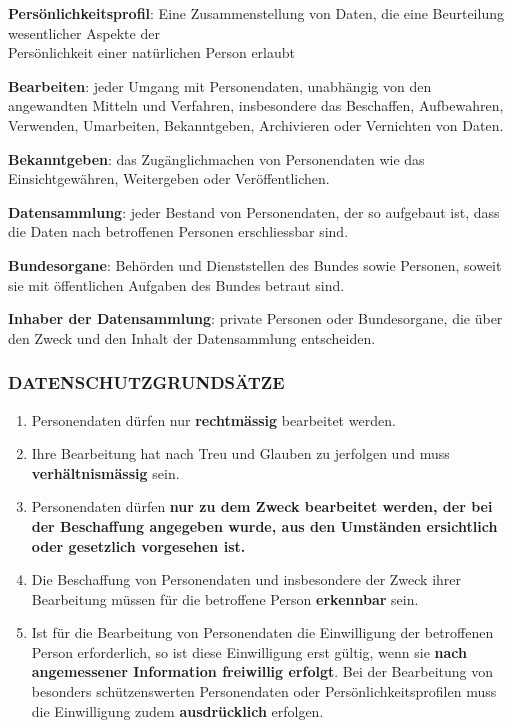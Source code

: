 \textbf{Persönlichkeitsprofil}: Eine Zusammenstellung von Daten, die
eine Beurteilung wesentlicher Aspekte der\\
Persönlichkeit einer natürlichen Person erlaubt

\textbf{Bearbeiten}: jeder Umgang mit Personendaten, unabhängig von den
angewandten Mitteln und Verfahren, insbesondere das Beschaffen,
Aufbewahren, Verwenden, Umarbeiten, Bekanntgeben, Archivieren oder
Vernichten von Daten.

\textbf{Bekanntgeben}: das Zugänglichmachen von Personendaten wie das
Einsichtgewähren, Weitergeben oder Veröffentlichen.

\textbf{Datensammlung}: jeder Bestand von Personendaten, der so
aufgebaut ist, dass die Daten nach betroffenen Personen erschliessbar
sind.

\textbf{Bundesorgane}: Behörden und Dienststellen des Bundes sowie
Personen, soweit sie mit öffentlichen Aufgaben des Bundes betraut sind.

\textbf{Inhaber der Datensammlung}: private Personen oder Bundesorgane,
die über den Zweck und den Inhalt der Datensammlung entscheiden.

\hypertarget{datenschutzgrundsuxe4tze}{%
\subsubsection{DATENSCHUTZGRUNDSÄTZE}\label{datenschutzgrundsuxe4tze}}

\begin{enumerate}
\def\labelenumi{\arabic{enumi}.}
\tightlist
\item
  Personendaten dürfen nur \textbf{rechtmässig} bearbeitet werden.
\item
  Ihre Bearbeitung hat nach Treu und Glauben zu jerfolgen und muss
  \textbf{verhältnismässig} sein.
\item
  Personendaten dürfen \textbf{nur zu dem Zweck bearbeitet werden, der
  bei der Beschaffung angegeben wurde, aus den Umständen ersichtlich
  oder gesetzlich vorgesehen ist.}
\item
  Die Beschaffung von Personendaten und insbesondere der Zweck ihrer
  Bearbeitung müssen für die betroffene Person \textbf{erkennbar} sein.
\item
  Ist für die Bearbeitung von Personendaten die Einwilligung der
  betroffenen Person erforderlich, so ist diese Einwilligung erst
  gültig, wenn sie \textbf{nach angemessener Information freiwillig
  erfolgt}. Bei der Bearbeitung von besonders schützenswerten
  Personendaten oder Persönlichkeitsprofilen muss die Einwilligung zudem
  \textbf{ausdrücklich} erfolgen.
\end{enumerate}

